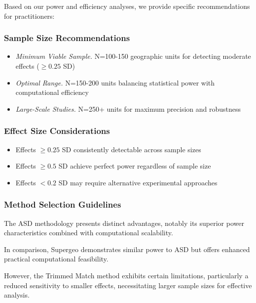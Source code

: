 \documentclass[final,3p,fleqn, 10pt]{elsarticle}
\begin{document}
Based on our power and efficiency analyses, we provide specific recommendations for practitioners:

\subsubsection{Sample Size Recommendations}

\begin{itemize}
    \item \textit{Minimum Viable Sample.} N=100-150 geographic units for detecting moderate effects ($\geq 0.25$ SD)
    \item \textit{Optimal Range.} N=150-200 units balancing statistical power with computational efficiency
    \item \textit{Large-Scale Studies.} N=250+ units for maximum precision and robustness
\end{itemize}

\subsubsection{Effect Size Considerations}

\begin{itemize}
    \item %
    Effects $\geq 0.25$ SD consistently detectable across sample sizes
    \item %
    Effects $\geq 0.5$ SD achieve perfect power regardless of sample size
    \item %
    Effects $< 0.2$ SD may require alternative experimental approaches
\end{itemize}

\subsubsection{Method Selection Guidelines}

The ASD methodology presents distinct advantages, notably its superior power characteristics combined with computational scalability.

In comparison, Supergeo demonstrates similar power to ASD but offers enhanced practical computational feasibility.

However, the Trimmed Match method exhibits certain limitations, particularly a reduced sensitivity to smaller effects, necessitating larger sample sizes for effective analysis.
\end{document}
